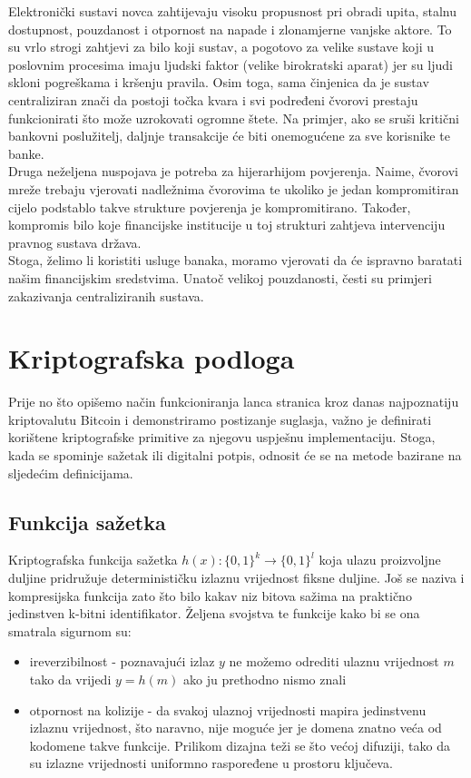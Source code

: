 \documentclass[utf8, zavrsni]{fer}
\begin{document}
Elektronički sustavi novca zahtijevaju visoku propusnost pri obradi upita, stalnu dostupnost, pouzdanost i otpornost na napade i zlonamjerne vanjske aktore. To su vrlo strogi zahtjevi za bilo koji sustav, a pogotovo za velike sustave koji u poslovnim procesima imaju ljudski faktor (velike birokratski aparat) jer su ljudi skloni pogreškama i kršenju pravila. Osim toga, sama činjenica da je sustav centraliziran znači da postoji točka kvara i svi podređeni čvorovi prestaju funkcionirati što može uzrokovati ogromne štete. Na primjer, ako se sruši kritični bankovni poslužitelj, daljnje transakcije će biti onemogućene za sve korisnike te banke. \\

Druga neželjena nuspojava je potreba za hijerarhijom povjerenja. Naime, čvorovi mreže trebaju vjerovati nadležnima čvorovima te ukoliko je jedan kompromitiran cijelo podstablo takve strukture povjerenja je kompromitirano. Također, kompromis bilo koje financijske institucije u toj strukturi zahtjeva intervenciju pravnog sustava država. \\

Stoga, želimo li koristiti usluge banaka, moramo vjerovati da će ispravno baratati našim financijskim sredstvima.
Unatoč velikoj pouzdanosti, česti su primjeri zakazivanja centraliziranih sustava.

\chapter{Kriptografska podloga}
Prije no što opišemo način funkcioniranja lanca stranica kroz danas najpoznatiju kriptovalutu Bitcoin i demonstriramo postizanje suglasja, važno je definirati korištene kriptografske primitive za njegovu uspješnu implementaciju. Stoga, kada se spominje sažetak ili digitalni potpis, odnosit će se na metode bazirane na sljedećim definicijama.

\section{Funkcija sažetka}
Kriptografska funkcija sažetka $h(x): \{0,1\}^k \rightarrow \{0,1\}^l$ koja ulazu proizvoljne duljine pridružuje determinističku izlaznu vrijednost fiksne duljine. Još se naziva i kompresijska funkcija zato što bilo kakav niz bitova sažima na praktično jedinstven k-bitni identifikator. Željena svojstva te funkcije kako bi se ona smatrala sigurnom su:

\begin{itemize}
	\item ireverzibilnost - poznavajući izlaz $y$ ne možemo odrediti ulaznu vrijednost $m$ tako da vrijedi $y = h(m)$ ako ju prethodno nismo znali
	\item otpornost na kolizije - da svakoj ulaznoj vrijednosti mapira jedinstvenu izlaznu vrijednost, što naravno, nije moguće jer je domena znatno veća od kodomene takve funkcije. Prilikom dizajna teži se što većoj difuziji, tako da su izlazne vrijednosti uniformno raspoređene u prostoru ključeva.
\end{itemize}
\end{document}

